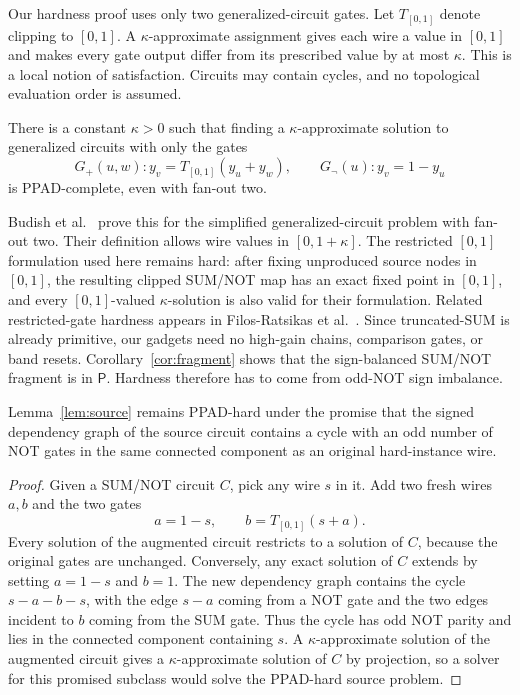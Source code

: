 \documentclass{llncs}
\newcommand{\T}{T_{[0,1]}}
\begin{document}
Our hardness proof uses only two generalized-circuit gates. Let \(\T\) denote clipping to \([0,1]\). A \(\kappa\)-approximate assignment gives each wire a value in \([0,1]\) and makes every gate output differ from its prescribed value by at most \(\kappa\). This is a local notion of satisfaction. Circuits may contain cycles, and no topological evaluation order is assumed.
\begin{lemma}
\label{lem:source}
There is a constant \(\kappa>0\) such that finding a \(\kappa\)-approximate solution to generalized circuits with only the gates
\[
G_+(u,w): y_v=\T(y_u+y_w),\qquad
G_{\neg}(u): y_v=1-y_u
\]
is PPAD-complete, even with fan-out two.
\end{lemma}
Budish et al.~\cite[Appendix D.1, Definitions 10--11 and Theorem 3]{Budish2023} prove this for the simplified generalized-circuit problem with fan-out two. Their definition allows wire values in \([0,1+\kappa]\). The restricted \([0,1]\) formulation used here remains hard: after fixing unproduced source nodes in \([0,1]\), the resulting clipped SUM/NOT map has an exact fixed point in \([0,1]\), and every \([0,1]\)-valued \(\kappa\)-solution is also valid for their formulation. Related restricted-gate hardness appears in Filos-Ratsikas et al.~\cite{FilosRatsikas2023}. Since truncated-SUM is already primitive, our gadgets need no high-gain chains, comparison gates, or band resets. Corollary~\ref{cor:fragment} shows that the sign-balanced SUM/NOT fragment is in \(\mathsf P\). Hardness therefore has to come from odd-NOT sign imbalance.

\begin{lemma}
\label{lem:unbalancedsource}
Lemma~\ref{lem:source} remains PPAD-hard under the promise that the signed dependency graph of the source circuit contains a cycle with an odd number of NOT gates in the same connected component as an original hard-instance wire.
\end{lemma}
\begin{proof}
Given a SUM/NOT circuit \(C\), pick any wire \(s\) in it. Add two fresh wires \(a,b\) and the two gates
\[
       a=1-s,\qquad b=\T(s+a).
\]
Every solution of the augmented circuit restricts to a solution of \(C\), because the original gates are unchanged. Conversely, any exact solution of \(C\) extends by setting \(a=1-s\) and \(b=1\). The new dependency graph contains the cycle \(s-a-b-s\), with the edge \(s-a\) coming from a NOT gate and the two edges incident to \(b\) coming from the SUM gate. Thus the cycle has odd NOT parity and lies in the connected component containing \(s\). A \(\kappa\)-approximate solution of the augmented circuit gives a \(\kappa\)-approximate solution of \(C\) by projection, so a solver for this promised subclass would solve the PPAD-hard source problem.
\end{proof}
\end{document}
